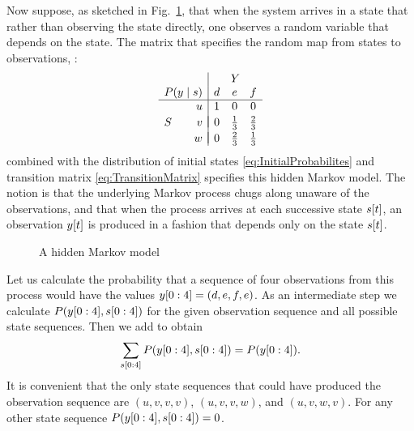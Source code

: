 %
Now suppose, as sketched in Fig.~\ref{fig:dhmm}, that when the system
arrives in a state that rather than observing the state directly, one
observes a random variable that depends on the state.  The matrix that
specifies the random map from states to observations, \ie%
:
\begin{equation*}
  \begin{array}{cr|ccc}
      &      &\multicolumn{3}{c}{Y} \\
      \multicolumn{2}{r|}{P(y\given s)} & d & e           & f \\ %
      \hline%
      & u      & 1 & 0           & 0 \\
      &        & \vspace{-1 em} \\
    S & v      & 0 & \frac{1}{3} & \frac{2}{3} \\
      &        & \vspace{-1 em} \\
      & w      & 0 & \frac{2}{3} & \frac{1}{3}
  \end{array}%
\end{equation*}
combined with the distribution of initial states
\eqref{eq:InitialProbabilites} and transition matrix
\eqref{eq:TransitionMatrix} specifies this hidden Markov model.  The
notion is that the underlying Markov process chugs along unaware of
the observations, and that when the process arrives at each successive
state ${s}{[t]}$, an observation ${y}{[t]}$ is produced in a fashion
that depends only on the state ${s}{[t]}$.

\begin{figure}[htbp]
  \centering{\plotsize%
    }
  \caption[A hidden Markov model.]{A hidden Markov model}
  \label{fig:dhmm}
\end{figure}

Let us calculate the probability that a sequence of four observations
from this process would have the values $y[0:4] = (d,e,f,e)$.
As an intermediate step we calculate $P(y[0:4],s[0:4])$
for the given observation sequence and all possible state sequences.
Then we add to obtain
\begin{equation}
  \label{eq:dhmm_sum}
  \sum_{s[0:4]} P(y[0:4],s[0:4]) = P(y[0:4]).
\end{equation}
It is convenient that the only state sequences that could have
produced the observation sequence are $(u,v,v,v)$, $(u,v,v,w)$, and
$(u,v,w,v)$.  For any other state sequence
$P(y[0:4],s[0:4]) = 0$.

